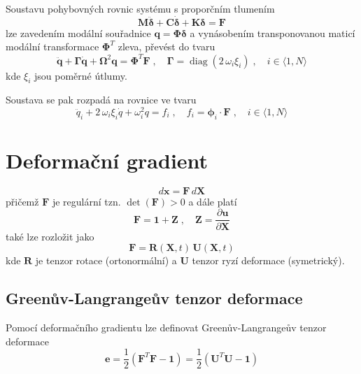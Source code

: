 \documentclass{article}
\begin{document}
	Soustavu pohybovných rovnic systému s proporčním tlumením
	\begin{equation}
		\bm{M}\bm{\ddot{\delta}} + \bm{C}\bm{\dot{\delta}} + \bm{K}\bm{\delta} = \bm{F}
	\end{equation}
	lze zavedením modální souřadnice $\bm{q} = \bm{\Phi}\bm{\delta}$ a vynásobením transponovanou maticí modální transformace $\bm{\Phi}^T$ zleva, převést do tvaru
	\begin{equation}
		\bm{\ddot{q}} + \bm{\Gamma}\bm{\dot{q}} + \bm{\Omega}^2 \bm{q} = \bm{\Phi}^T \bm{F}
		\;,\quad 
		\bm{\Gamma} = \operatorname{diag}(2\,\omega_i\xi_i) \;,\quad i \in \langle 1,N \rangle
	\end{equation}
	kde $\xi_i$ jsou poměrné útlumy.

	Soustava se pak rozpadá na rovnice ve tvaru
	\begin{equation}
		\ddot{q}_i + 2\,\omega_i\xi_i \dot{q} + \omega_i^2 q = f_i
		\;,\quad 
		f_i = \bm{\phi}_i \cdot \bm{F}
		\;,\quad 
		i \in \langle 1,N \rangle
	\end{equation}

	\section{Deformační gradient}
	\begin{equation}
		d\bm{x} = \bm{F} \, d\bm{X}
	\end{equation}
	přičemž $\bm{F}$ je regulární tzn. $\det(\bm{F}) > 0$ a dále platí
	\begin{equation}
	\bm{F} = \bm{1} + \bm{Z}
	\;,\quad 
	\bm{Z} = \frac{\partial \bm{u}}{\partial \bm{X}}
	\end{equation}
	také lze rozložit jako
	\begin{equation}
	\bm{F} = \bm{R}(\bm{X},t)\,\bm{U}(\bm{X},t)
	\end{equation}
	kde $\bm{R}$ je tenzor rotace (ortonormální) a $\bm{U}$ tenzor ryzí deformace (symetrický).
	
	\subsection{Greenův-Langrangeův tenzor deformace}
	Pomocí deformačního gradientu lze definovat Greenův-Langrangeův tenzor deformace
	\begin{equation}
	\bm{e} = \frac{1}{2}(\bm{F}^T\bm{F} - \bm{1}) = \frac{1}{2}(\bm{U}^T\bm{U} - \bm{1})
	\end{equation}
\end{document}
